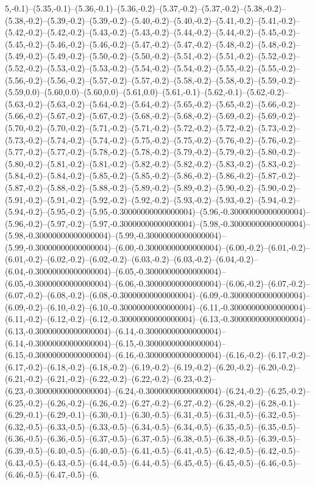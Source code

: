 5,-0.1)--(5.35,-0.1)--(5.36,-0.1)--(5.36,-0.2)--(5.37,-0.2)--(5.37,-0.2)--(5.38,-0.2)--(5.38,-0.2)--(5.39,-0.2)--(5.39,-0.2)--(5.40,-0.2)--(5.40,-0.2)--(5.41,-0.2)--(5.41,-0.2)--(5.42,-0.2)--(5.42,-0.2)--(5.43,-0.2)--(5.43,-0.2)--(5.44,-0.2)--(5.44,-0.2)--(5.45,-0.2)--(5.45,-0.2)--(5.46,-0.2)--(5.46,-0.2)--(5.47,-0.2)--(5.47,-0.2)--(5.48,-0.2)--(5.48,-0.2)--(5.49,-0.2)--(5.49,-0.2)--(5.50,-0.2)--(5.50,-0.2)--(5.51,-0.2)--(5.51,-0.2)--(5.52,-0.2)--(5.52,-0.2)--(5.53,-0.2)--(5.53,-0.2)--(5.54,-0.2)--(5.54,-0.2)--(5.55,-0.2)--(5.55,-0.2)--(5.56,-0.2)--(5.56,-0.2)--(5.57,-0.2)--(5.57,-0.2)--(5.58,-0.2)--(5.58,-0.2)--(5.59,-0.2)--(5.59,0.0)--(5.60,0.0)--(5.60,0.0)--(5.61,0.0)--(5.61,-0.1)--(5.62,-0.1)--(5.62,-0.2)--(5.63,-0.2)--(5.63,-0.2)--(5.64,-0.2)--(5.64,-0.2)--(5.65,-0.2)--(5.65,-0.2)--(5.66,-0.2)--(5.66,-0.2)--(5.67,-0.2)--(5.67,-0.2)--(5.68,-0.2)--(5.68,-0.2)--(5.69,-0.2)--(5.69,-0.2)--(5.70,-0.2)--(5.70,-0.2)--(5.71,-0.2)--(5.71,-0.2)--(5.72,-0.2)--(5.72,-0.2)--(5.73,-0.2)--(5.73,-0.2)--(5.74,-0.2)--(5.74,-0.2)--(5.75,-0.2)--(5.75,-0.2)--(5.76,-0.2)--(5.76,-0.2)--(5.77,-0.2)--(5.77,-0.2)--(5.78,-0.2)--(5.78,-0.2)--(5.79,-0.2)--(5.79,-0.2)--(5.80,-0.2)--(5.80,-0.2)--(5.81,-0.2)--(5.81,-0.2)--(5.82,-0.2)--(5.82,-0.2)--(5.83,-0.2)--(5.83,-0.2)--(5.84,-0.2)--(5.84,-0.2)--(5.85,-0.2)--(5.85,-0.2)--(5.86,-0.2)--(5.86,-0.2)--(5.87,-0.2)--(5.87,-0.2)--(5.88,-0.2)--(5.88,-0.2)--(5.89,-0.2)--(5.89,-0.2)--(5.90,-0.2)--(5.90,-0.2)--(5.91,-0.2)--(5.91,-0.2)--(5.92,-0.2)--(5.92,-0.2)--(5.93,-0.2)--(5.93,-0.2)--(5.94,-0.2)--(5.94,-0.2)--(5.95,-0.2)--(5.95,-0.30000000000000004)--(5.96,-0.30000000000000004)--(5.96,-0.2)--(5.97,-0.2)--(5.97,-0.30000000000000004)--(5.98,-0.30000000000000004)--(5.98,-0.30000000000000004)--(5.99,-0.30000000000000004)--(5.99,-0.30000000000000004)--(6.00,-0.30000000000000004)--(6.00,-0.2)--(6.01,-0.2)--(6.01,-0.2)--(6.02,-0.2)--(6.02,-0.2)--(6.03,-0.2)--(6.03,-0.2)--(6.04,-0.2)--(6.04,-0.30000000000000004)--(6.05,-0.30000000000000004)--(6.05,-0.30000000000000004)--(6.06,-0.30000000000000004)--(6.06,-0.2)--(6.07,-0.2)--(6.07,-0.2)--(6.08,-0.2)--(6.08,-0.30000000000000004)--(6.09,-0.30000000000000004)--(6.09,-0.2)--(6.10,-0.2)--(6.10,-0.30000000000000004)--(6.11,-0.30000000000000004)--(6.11,-0.2)--(6.12,-0.2)--(6.12,-0.30000000000000004)--(6.13,-0.30000000000000004)--(6.13,-0.30000000000000004)--(6.14,-0.30000000000000004)--(6.14,-0.30000000000000004)--(6.15,-0.30000000000000004)--(6.15,-0.30000000000000004)--(6.16,-0.30000000000000004)--(6.16,-0.2)--(6.17,-0.2)--(6.17,-0.2)--(6.18,-0.2)--(6.18,-0.2)--(6.19,-0.2)--(6.19,-0.2)--(6.20,-0.2)--(6.20,-0.2)--(6.21,-0.2)--(6.21,-0.2)--(6.22,-0.2)--(6.22,-0.2)--(6.23,-0.2)--(6.23,-0.30000000000000004)--(6.24,-0.30000000000000004)--(6.24,-0.2)--(6.25,-0.2)--(6.25,-0.2)--(6.26,-0.2)--(6.26,-0.2)--(6.27,-0.2)--(6.27,-0.2)--(6.28,-0.2)--(6.28,-0.1)--(6.29,-0.1)--(6.29,-0.1)--(6.30,-0.1)--(6.30,-0.5)--(6.31,-0.5)--(6.31,-0.5)--(6.32,-0.5)--(6.32,-0.5)--(6.33,-0.5)--(6.33,-0.5)--(6.34,-0.5)--(6.34,-0.5)--(6.35,-0.5)--(6.35,-0.5)--(6.36,-0.5)--(6.36,-0.5)--(6.37,-0.5)--(6.37,-0.5)--(6.38,-0.5)--(6.38,-0.5)--(6.39,-0.5)--(6.39,-0.5)--(6.40,-0.5)--(6.40,-0.5)--(6.41,-0.5)--(6.41,-0.5)--(6.42,-0.5)--(6.42,-0.5)--(6.43,-0.5)--(6.43,-0.5)--(6.44,-0.5)--(6.44,-0.5)--(6.45,-0.5)--(6.45,-0.5)--(6.46,-0.5)--(6.46,-0.5)--(6.47,-0.5)--(6.